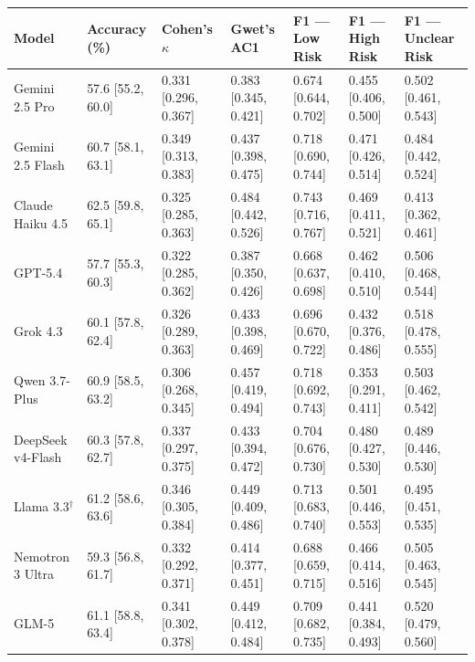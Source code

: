 \begin{tabular}{lllllll}
\toprule
Model & Accuracy (\%) & Cohen's $\kappa$ & Gwet's AC1 & F1 --- Low Risk & F1 --- High Risk & F1 --- Unclear Risk \\
\midrule
Gemini 2.5 Pro & 57.6 [55.2, 60.0] & 0.331 [0.296, 0.367] & 0.383 [0.345, 0.421] & 0.674 [0.644, 0.702] & 0.455 [0.406, 0.500] & 0.502 [0.461, 0.543] \\
Gemini 2.5 Flash & 60.7 [58.1, 63.1] & 0.349 [0.313, 0.383] & 0.437 [0.398, 0.475] & 0.718 [0.690, 0.744] & 0.471 [0.426, 0.514] & 0.484 [0.442, 0.524] \\
Claude Haiku 4.5 & 62.5 [59.8, 65.1] & 0.325 [0.285, 0.363] & 0.484 [0.442, 0.526] & 0.743 [0.716, 0.767] & 0.469 [0.411, 0.521] & 0.413 [0.362, 0.461] \\
GPT-5.4 & 57.7 [55.3, 60.3] & 0.322 [0.285, 0.362] & 0.387 [0.350, 0.426] & 0.668 [0.637, 0.698] & 0.462 [0.410, 0.510] & 0.506 [0.468, 0.544] \\
Grok 4.3 & 60.1 [57.8, 62.4] & 0.326 [0.289, 0.363] & 0.433 [0.398, 0.469] & 0.696 [0.670, 0.722] & 0.432 [0.376, 0.486] & 0.518 [0.478, 0.555] \\
Qwen 3.7-Plus & 60.9 [58.5, 63.2] & 0.306 [0.268, 0.345] & 0.457 [0.419, 0.494] & 0.718 [0.692, 0.743] & 0.353 [0.291, 0.411] & 0.503 [0.462, 0.542] \\
DeepSeek v4-Flash & 60.3 [57.8, 62.7] & 0.337 [0.297, 0.375] & 0.433 [0.394, 0.472] & 0.704 [0.676, 0.730] & 0.480 [0.427, 0.530] & 0.489 [0.446, 0.530] \\
Llama 3.3$^\dagger$ & 61.2 [58.6, 63.6] & 0.346 [0.305, 0.384] & 0.449 [0.409, 0.486] & 0.713 [0.683, 0.740] & 0.501 [0.446, 0.553] & 0.495 [0.451, 0.535] \\
Nemotron 3 Ultra & 59.3 [56.8, 61.7] & 0.332 [0.292, 0.371] & 0.414 [0.377, 0.451] & 0.688 [0.659, 0.715] & 0.466 [0.414, 0.516] & 0.505 [0.463, 0.545] \\
GLM-5 & 61.1 [58.8, 63.4] & 0.341 [0.302, 0.378] & 0.449 [0.412, 0.484] & 0.709 [0.682, 0.735] & 0.441 [0.384, 0.493] & 0.520 [0.479, 0.560] \\
\bottomrule
\end{tabular}

